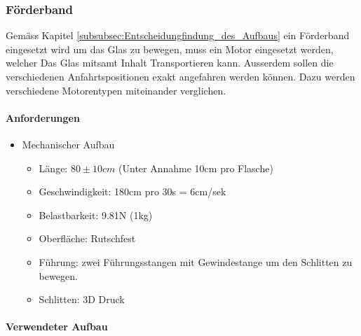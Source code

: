 \subsubsection{Förderband}
\label{subsubsec:Foerderband}

Gemäss Kapitel \ref{subsubsec:Entscheidungfindung_des_Aufbaus} ein Förderband eingesetzt wird um das Glas zu bewegen, muss ein Motor eingesetzt werden, welcher Das Glas mitsamt Inhalt Transportieren kann. Ausserdem sollen die verschiedenen Anfahrtspositionen exakt angefahren werden können. Dazu werden verschiedene Motorentypen miteinander verglichen.

\paragraph{Anforderungen}\label{par:Anforderungen_Foerderband}

\begin{itemize}
\item Mechanischer Aufbau
\begin{itemize}
\item Länge: $80\pm10cm$ (Unter Annahme 10cm pro Flasche)
\item Geschwindigkeit: 180cm pro 30s = 6cm/sek
\item Belastbarkeit: 9.81N (1kg)
\item Oberfläche: Rutschfest
\item Führung: zwei Führungsstangen mit Gewindestange um den Schlitten zu bewegen.
\item Schlitten: 3D Druck
\end{itemize}
\end{itemize}

\paragraph{Verwendeter Aufbau}\label{par:Verwendeter_Aufbau}

